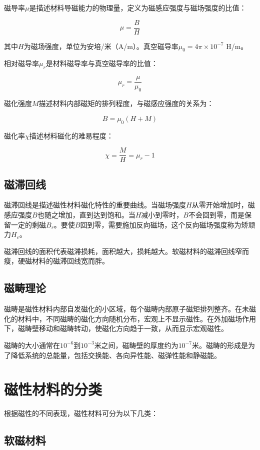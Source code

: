 \documentclass[12pt,UTF8]{ctexbook}
\begin{document}
磁导率$\mu$是描述材料导磁能力的物理量，定义为磁感应强度与磁场强度的比值：

$$ \mu = \frac{B}{H} $$

其中$H$为磁场强度，单位为安培/米（A/m）。真空磁导率$\mu_0 = 4\pi \times 10^{-7}$ H/m。

相对磁导率$\mu_r$是材料磁导率与真空磁导率的比值：

$$ \mu_r = \frac{\mu}{\mu_0} $$

磁化强度$M$描述材料内部磁矩的排列程度，与磁感应强度的关系为：

$$ B = \mu_0(H + M) $$

磁化率$\chi$描述材料磁化的难易程度：

$$ \chi = \frac{M}{H} = \mu_r - 1 $$

\subsection{磁滞回线}

磁滞回线是描述磁性材料磁化特性的重要曲线。当磁场强度$H$从零开始增加时，磁感应强度$B$也随之增加，直到达到饱和。当$H$减小到零时，$B$不会回到零，而是保留一定的剩磁$B_r$。要使$B$回到零，需要施加反向磁场，这个反向磁场强度称为矫顽力$H_c$。

磁滞回线的面积代表磁滞损耗，面积越大，损耗越大。软磁材料的磁滞回线窄而瘦，硬磁材料的磁滞回线宽而胖。

\subsection{磁畴理论}

磁畴是磁性材料内部自发磁化的小区域，每个磁畴内部原子磁矩排列整齐。在未磁化的材料中，不同磁畴的磁化方向随机分布，宏观上不显示磁性。在外加磁场作用下，磁畴壁移动和磁畴转动，使磁化方向趋于一致，从而显示宏观磁性。

磁畴的大小通常在$10^{-6}$到$10^{-3}$米之间，磁畴壁的厚度约为$10^{-7}$米。磁畴的形成是为了降低系统的总能量，包括交换能、各向异性能、磁弹性能和静磁能。

\section{磁性材料的分类}

根据磁性的不同表现，磁性材料可分为以下几类：

\subsection{软磁材料}
\end{document}
